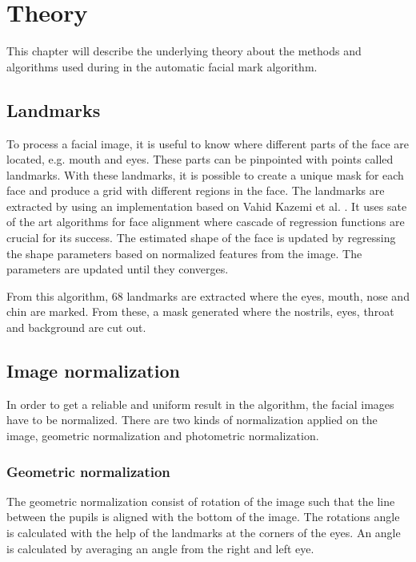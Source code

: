 \chapter{Theory}\label{cha:theory}

This chapter will describe the underlying theory about the methods and algorithms used during in the automatic facial mark algorithm. 

\section{Landmarks}

To process a facial image, it is useful to know where different parts of the face are located, e.g. mouth and eyes. These parts can be pinpointed with points called landmarks. With these landmarks, it is possible to create a unique mask for each face and produce a grid with different regions in the face. The landmarks are extracted by using an implementation based on Vahid Kazemi et al. \cite{dlib_landmark}. It uses sate of the art algorithms for face alignment where cascade of regression functions are crucial for its success. The estimated shape of the face is updated by regressing the shape parameters based on normalized features from the image. The parameters are updated until they converges.

From this algorithm, 68 landmarks are extracted where the eyes, mouth, nose and chin are marked. From these, a mask generated where the nostrils, eyes, throat and background are cut out. 

\section{Image normalization}

In order to get a reliable and uniform result in the algorithm, the facial images have to be normalized. There are two kinds of normalization applied on the image, geometric normalization and photometric normalization.  

\subsection{Geometric normalization}
The geometric normalization consist of rotation of the image such that the line between the pupils is aligned with the bottom of the image. The rotations angle is calculated with the help of the landmarks at the corners of the eyes. An angle is calculated by averaging an angle from the right and left eye. 


